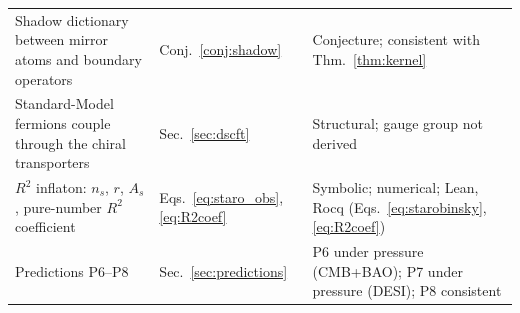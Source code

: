 \documentclass[reprint,aps,prd,amsmath,amssymb,superscriptaddress,nofootinbib,floatfix]{revtex4-2}
\theoremstyle{plain}
\theoremstyle{definition}
\theoremstyle{remark}
\begin{document}
\begin{table}[t]
\begin{ruledtabular}
\begin{tabular}{lll}
\parbox[t]{0.52\textwidth}{\raggedright Shadow dictionary between mirror atoms and boundary operators\strut} & \parbox[t]{0.17\textwidth}{\raggedright Conj.~\ref{conj:shadow}\strut} & \parbox[t]{0.25\textwidth}{\raggedright Conjecture; consistent with Thm.~\ref{thm:kernel}\strut} \\
\parbox[t]{0.52\textwidth}{\raggedright Standard-Model fermions couple through the chiral transporters\strut} & \parbox[t]{0.17\textwidth}{\raggedright Sec.~\ref{sec:dscft}\strut} & \parbox[t]{0.25\textwidth}{\raggedright Structural; gauge group not derived\strut} \\
\parbox[t]{0.52\textwidth}{\raggedright $R^2$ inflaton: $n_s$, $r$, $A_s$, pure-number $R^2$ coefficient\strut} & \parbox[t]{0.17\textwidth}{\raggedright Eqs.~\eqref{eq:staro_obs}, \eqref{eq:R2coef}\strut} & \parbox[t]{0.25\textwidth}{\raggedright Symbolic; numerical; Lean, Rocq (Eqs.~\eqref{eq:starobinsky}, \eqref{eq:R2coef})\strut} \\
\parbox[t]{0.52\textwidth}{\raggedright Predictions P6--P8\strut} & \parbox[t]{0.17\textwidth}{\raggedright Sec.~\ref{sec:predictions}\strut} & \parbox[t]{0.25\textwidth}{\raggedright P6 under pressure (CMB+BAO); P7 under pressure (DESI); P8 consistent\strut}
\end{tabular}
\end{ruledtabular}
\end{table}
\end{document}
